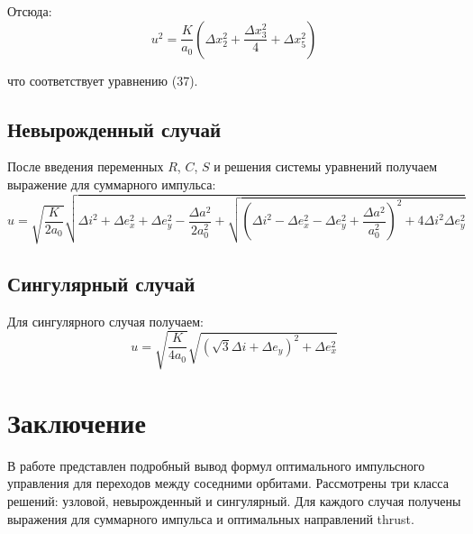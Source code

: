 \documentclass[12pt]{article}
\begin{document}
Отсюда:
\begin{equation*}
u^2 = \frac{K}{a_0}\left(\Delta x_2^2 + \frac{\Delta x_3^2}{4} + \Delta x_5^2\right)
\end{equation*}

что соответствует уравнению (37).

\subsection{Невырожденный случай}

После введения переменных $R$, $C$, $S$ и решения системы уравнений получаем выражение для суммарного импульса:
\begin{equation}
u = \sqrt{\frac{K}{2a_0}}\sqrt{\Delta i^2 + \Delta e_x^2 + \Delta e_y^2 - \frac{\Delta a^2}{2a_0^2} + \sqrt{\left(\Delta i^2 - \Delta e_x^2 - \Delta e_y^2 + \frac{\Delta a^2}{a_0^2}\right)^2 + 4\Delta i^2\Delta e_y^2}} \tag{68}
\end{equation}

\subsection{Сингулярный случай}

Для сингулярного случая получаем:
\begin{equation}
u = \sqrt{\frac{K}{4a_0}}\sqrt{\left(\sqrt{3}\Delta i + \Delta e_y\right)^2 + \Delta e_x^2} \tag{75}
\end{equation}

\section{Заключение}

В работе представлен подробный вывод формул оптимального импульсного управления для переходов между соседними орбитами. Рассмотрены три класса решений: узловой, невырожденный и сингулярный. Для каждого случая получены выражения для суммарного импульса и оптимальных направлений thrust.
\end{document}
